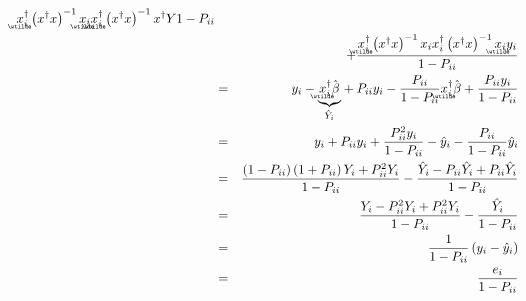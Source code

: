 \documentclass{article}
\begin{document}
\begin{eqnarray*}
{%
\underaccent{\wtilde}{x}%
_{i}^{\dagger }\left( x^{\dagger }x\right) ^{-1}%
\underaccent{\wtilde}{x}%
_{i}%
\underaccent{\wtilde}{x}%
_{i}^{\dagger }\left( x^{\dagger }x\right) ^{-1}x^{\dagger }Y}{1-P_{ii}} \\
&&+\frac{%
\underaccent{\wtilde}{x}%
_{i}^{\dagger }\left( x^{\dagger }x\right) ^{-1}x_{i}x_{i}^{\dagger }\left(
x^{\dagger }x\right) ^{-1}%
\underaccent{\wtilde}{x}%
_{i}y_{i}}{1-P_{ii}} \\
&=&y_{i}-\underset{\hat{Y}_{i}}{\underbrace{%
\underaccent{\wtilde}{x}%
_{i}^{\dagger }\hat{\beta}}}+P_{ii}y_{i}-\frac{P_{ii}}{1-P_{ii}}%
\underaccent{\wtilde}{x}%
_{i}^{\dagger }\hat{\beta}+\frac{P_{ii}y_{i}}{1-P_{ii}} \\
&=&y_{i}+P_{ii}y_{i}+\frac{P_{ii}^{2}y_{i}}{1-P_{ii}}-\hat{y}_{i}-\frac{%
P_{ii}}{1-P_{ii}}\hat{y}_{i} \\
&=&\frac{\left( 1-P_{ii}\right) \left( 1+P_{ii}\right) Y_{i}+P_{ii}^{2}Y_{i}%
}{1-P_{ii}}-\frac{\hat{Y}_{i}-P_{ii}\hat{Y}_{i}+P_{ii}\hat{Y}_{i}}{1-P_{ii}}
\\
&=&\frac{Y_{i}-P_{ii}^{2}Y_{i}+P_{ii}^{2}Y_{i}}{1-P_{ii}}-\frac{\hat{Y}_{i}}{%
1-P_{ii}} \\
&=&\frac{1}{1-P_{ii}}\left( y_{i}-\hat{y}_{i}\right) \\
&=&\frac{e_{i}}{1-P_{ii}}
\end{eqnarray*}
\end{document}
